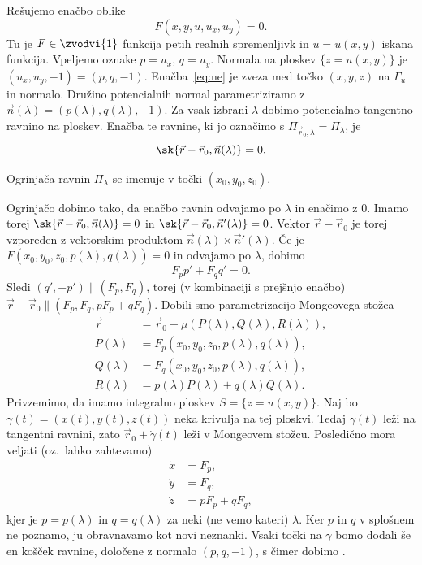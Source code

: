 
Rešujemo enačbo oblike
\begin{equation}
  \label{eq:ne}
  F(x, y, u, u_x, u_y) = 0.
\end{equation}
Tu je $F \in \zvodvi{1}$ funkcija petih realnih spremenljivk in $u = u(x, y)$
iskana funkcija.
Vpeljemo oznake $p = u_x$, $q = u_y$.
Normala na ploskev $\{z = u(x, y)\}$ je $(u_x, u_y, -1) = (p, q, -1)$.
Enačba~\eqref{eq:ne} je zveza med točko $(x, y, z)$ na $\Gamma_u$ in normalo.
Družino potencialnih normal parametriziramo z $\vec{n}(\lambda) = (p(\lambda),
q(\lambda), -1)$.
Za vsak izbrani $\lambda$ dobimo potencialno tangentno ravnino na ploskev.
Enačba te ravnine, ki jo označimo s $\Pi_{\vec{r}_0, \lambda} = \Pi_\lambda$, je
\[
  \sk{\vec{r} - \vec{r}_0, \vec{n}(\lambda)} = 0.
\]

\begin{definicija}
  Ogrinjača ravnin $\Pi_\lambda$ se imenuje  v točki
  $(x_0, y_0, z_0)$.
\end{definicija}

Ogrinjačo dobimo tako, da enačbo ravnin odvajamo po $\lambda$ in enačimo z $0$.
Imamo torej $\sk{\vec{r} - \vec{r}_0, \vec{n}(\lambda)} = 0$ in $\sk{\vec{r} -
  \vec{r}_0, \vec{n}'(\lambda)} = 0$.
Vektor $\vec{r} - \vec{r}_0$ je torej vzporeden z vektorskim produktom
$\vec{n}(\lambda) \times \vec{n}'(\lambda)$.
Če je $F(x_0, y_0, z_0, p(\lambda), q(\lambda)) = 0$ in odvajamo po $\lambda$,
dobimo
\[
  F_p p' + F_q q' = 0.
\]
Sledi $(q', -p') \parallel (F_p, F_q)$, torej (v kombinaciji s prejšnjo enačbo)
$\vec{r} - \vec{r}_0 \parallel (F_p, F_q, p F_p + q F_q)$.
Dobili smo parametrizacijo Mongeovega stožca
\begin{align*}
  \vec{r} &= \vec{r}_0 + \mu (P(\lambda), Q(\lambda), R(\lambda)), \\
  P(\lambda) &= F_p(x_0, y_0, z_0, p(\lambda), q(\lambda)), \\
  Q(\lambda) &= F_q(x_0, y_0, z_0, p(\lambda), q(\lambda)), \\
  R(\lambda) &= p(\lambda) P(\lambda) + q(\lambda) Q(\lambda).
\end{align*}
Privzemimo, da imamo integralno ploskev $S = \{z = u(x, y)\}$.
Naj bo $\gamma(t) = (x(t), y(t), z(t))$ neka krivulja na tej ploskvi.
Tedaj $\dot{\gamma}(t)$ leži na tangentni ravnini, zato $\vec{r}_0 +
\dot{\gamma}(t)$ leži v Mongeovem stožcu.
Posledično mora veljati (oz.~lahko zahtevamo)
\begin{align*}
  \dot{x} &= F_p, \\
  \dot{y} &= F_q, \\
  \dot{z} &= p F_p + q F_q,
\end{align*}
kjer je $p = p(\lambda)$ in $q = q(\lambda)$ za neki (ne vemo kateri) $\lambda$.
Ker $p$ in $q$ v splošnem ne poznamo, ju obravnavamo kot novi neznanki.
Vsaki točki na $\gamma$ bomo dodali še en košček ravnine, določene z normalo
$(p, q, -1)$, s čimer dobimo .


